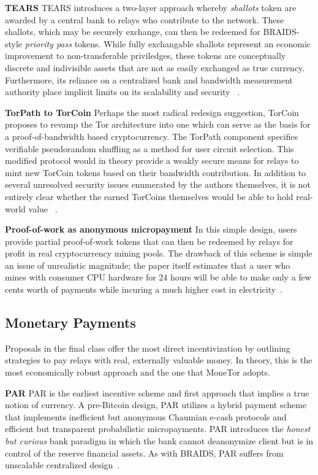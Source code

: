 \textbf{TEARS} TEARS introduces a two-layer approach whereby \emph{shallots}
token are awarded by a central bank to relays who contribute to the
network. These shallots, which may be securely exchange, can then be redeemed
for BRAIDS-style \emph{priority pass} tokens. While fully exchangable shallots
represent an economic improvement to non-transferable priviledges, these tokens
are conceptually discrete and indivisible assets that are not as easily
exchanged as true currency. Furthermore, its reliance on a centralized bank and
bandwidth measurement authority place implicit limits on its scalability and
security ~\cite{jansen2010recruiting}.

\textbf{TorPath to TorCoin} Perhaps the most radical redesign suggestion,
TorCoin proposes to revamp the Tor architecture into one which can serve as the
basis for a proof-of-bandwidth based cryptocurrency. The TorPath component
specifies verifiable pseudorandom shuffling as a method for user circuit
selection. This modified protocol would in theory provide a weakly secure means
for relays to mint new TorCoin tokens based on their bandwidth contribution. In
addition to several unresolved security issues enumerated by the authors
themselves, it is not entirely clear whether the earned TorCoins themselves
would be able to hold real-world value ~\cite{ghosh2014torpath}.

\textbf{Proof-of-work as anonymous micropayment} In this simple design,
users provide partial proof-of-work tokens that can then be redeemed by relays
for profit in real cryptocurrency mining pools. The drawback of this scheme is
simple an issue of unrealistic magnitude; the paper itself estimates that a user
who mines with consumer CPU hardware for 24 hours will be able to make only a
few cents worth of payments while incuring a much higher cost in
electricity~\cite{biryukov2015proof}.

\subsection{Monetary Payments}

Proposals in the final class offer the most direct incentivization by outlining
strategies to pay relays with real, externally valuable money. In theory, this
is the most economically robust approach and the one that MoneTor adopts.

\textbf{PAR} PAR is the earliest incentive scheme and first approach that
implies a true notion of currency. A pre-Bitcoin design, PAR utilizes a hybrid
payment scheme that implements inefficient but anonymous Chaumian e-cash
protocols and efficient but transparent probabilistic micropayments. PAR
introduces the \emph{honest but curious} bank paradigm in which the bank cannot
deanonymize client but is in control of the reserve financial assets. As with
BRAIDS, PAR suffers from unscalable centralized design~\cite{androulaki2008payment}.

